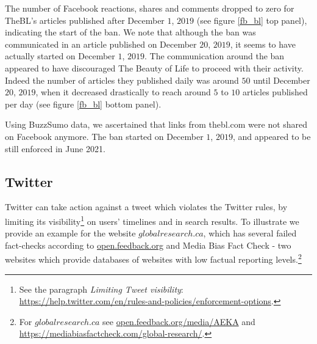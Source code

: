 \documentclass{article}
\begin{document}
The number of Facebook reactions, shares and comments dropped to zero for TheBL’s articles published after December $1$, $2019$ (see figure \ref{fb_bl} top panel), indicating the start of the ban. We note that although the ban was communicated in an article published on December $20$, $2019$, it seems to have actually started on December $1$, $2019$. The communication around the ban appeared to have discouraged The Beauty of Life to proceed with their activity. Indeed the number of articles they published daily was around $50$ until December $20$, $2019$, when it decreased drastically to reach around $5$ to $10$ articles published per day (see figure \ref{fb_bl} bottom panel). 

Using BuzzSumo data, we ascertained that links from thebl.com were not shared on Facebook anymore. The ban started on December $1$, $2019$, and appeared to be still enforced in June 2021.

\subsection{Twitter}  \label{globalresearch}

Twitter can take action against a tweet which violates the Twitter rules, by limiting its visibility\footnote{See the paragraph {\it Limiting Tweet visibility}: \href{https://help.twitter.com/en/rules-and-policies/enforcement-options}{https://help.twitter.com/en/rules-and-policies/enforcement-options}.} on users' timelines and in search results. To illustrate we provide an example for the website $globalresearch.ca$, which has several failed fact-checks according to \href{https://open.feedback.org/media/AEKA}{open.feedback.org} and Media Bias Fact Check - two websites which provide databases of websites with low factual reporting levels.\footnote{For $globalresearch.ca$ see \href{https://open.feedback.org/media/AEKA}{open.feedback.org/media/AEKA} and \href{https://mediabiasfactcheck.com/global-research/}{https://mediabiasfactcheck.com/global-research/}.}
\end{document}
